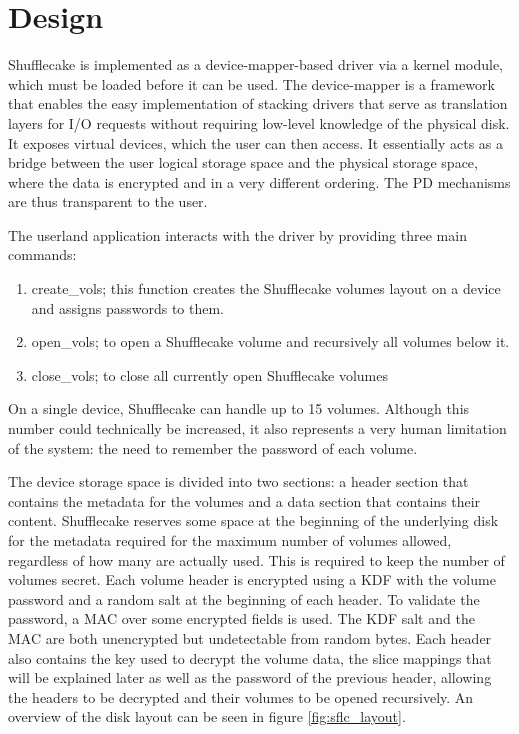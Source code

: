 \documentclass[a4paper,11pt,oneside]{report}
\begin{document}
\section{Design}

Shufflecake is implemented as a device-mapper-based driver via a kernel module, which must be loaded before it can be used. The device-mapper is a framework that enables the easy implementation of stacking drivers that serve as translation layers for I/O requests without requiring low-level knowledge of the physical disk. It exposes virtual devices, which the user can then access. It essentially acts as a bridge between the user logical storage space and the physical storage space, where the data is encrypted and in a very different ordering. The PD mechanisms are thus transparent to the user.

The userland application interacts with the driver by providing three main commands:
\begin{enumerate}
    \item create\_vols; this function creates the Shufflecake volumes layout on a device and assigns passwords to them.
    \item open\_vols; to open a Shufflecake volume and recursively all volumes below it.
    \item close\_vols; to close all currently open Shufflecake volumes
\end{enumerate}
On a single device, Shufflecake can handle up to 15 volumes. Although this number could technically be increased, it also represents a very human limitation of the system: the need to remember the password of each volume.

The device storage space is divided into two sections: a header section that contains the metadata for the volumes and a data section that contains their content. Shufflecake reserves some space at the beginning of the underlying disk for the metadata required for the maximum number of volumes allowed, regardless of how many are actually used. This is required to keep the number of volumes secret. Each volume header is encrypted using a KDF with the volume password and a random salt at the beginning of each header. To validate the password, a MAC over some encrypted fields is used. The KDF salt and the MAC are both unencrypted but undetectable from random bytes. Each header also contains the key used to decrypt the volume data, the slice mappings that will be explained later as well as the password of the previous header, allowing the headers to be decrypted and their volumes to be opened recursively. An overview of the disk layout can be seen in figure \ref{fig:sflc_layout}.
\end{document}
